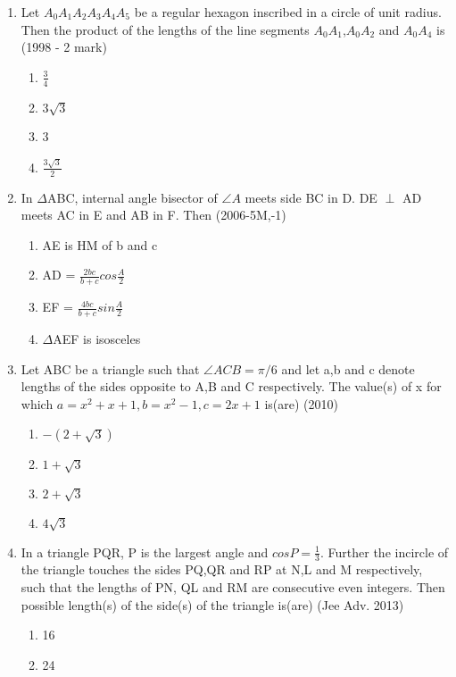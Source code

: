 \documentclass[journal,12pt,twocolumn]{IEEEtran}
\theoremstyle{remark}
\begin{document}
\begin{enumerate}[label=\arabic*.]
\begin{enumerate}[label=(\alph*)]
    \end{enumerate}
    \item Let $A_{0}A_{1}A_{2}A_{3}A_{4}A_{5}$ be a regular hexagon inscribed in a circle of unit radius. Then the product of the lengths of the line segments $A_{0}A_{1}$,$A_{0}A_{2}$ and $A_{0}A_{4}$ is 
    \hfill{(1998 - 2 mark)}
    \begin{enumerate}[label=(\alph*)]
    \item ${\frac{3}{4}}$
    \item $3\sqrt{3}$
    \item 3
    \item ${\frac{3\sqrt{3}}{2}}$
    \end{enumerate}
    \item In $\Delta$ABC, internal angle bisector of $\angle A$ meets side BC in D. DE $\perp$ AD meets AC in E and AB in F. Then
    \hfill{(2006-5M,-1)}
    \begin{enumerate}[label=(\alph*)]
    \item AE is HM of b and c
    \item AD = ${\frac{2bc}{b+c}}cos{\frac{A}{2}}$
    \item EF = ${\frac{4bc}{b+c}}sin{\frac{A}{2}}$
    \item $\Delta$AEF is isosceles
    \end{enumerate}
    \item Let ABC be a triangle such that $\angle ACB = \pi/6$ and let a,b and c denote lengths of the sides opposite to A,B and C respectively. The value(s) of x for which $a = x^{2}+x+1, b = x^{2}-1, c = 2x+1$ is(are)
    \hfill{(2010)}
    \begin{enumerate}[label=(\alph*)]
    \item $-(2+\sqrt{3})$
    \item $1+\sqrt{3}$
    \item $2+\sqrt{3}$
    \item $4\sqrt{3}$
    \end{enumerate}
    \item In a triangle PQR, P is the largest angle and $cosP = \frac{1}{3}$. Further the incircle of the triangle touches the sides PQ,QR and RP at N,L and M respectively, such that the lengths of PN, QL and RM are consecutive even integers. Then possible length(s) of the side(s) of the triangle is(are)
    \hfill{(Jee Adv. 2013)}
    \begin{enumerate}[label=(\alph*)]
    \item 16
    \item 24

\end{enumerate}
\end{enumerate}
\end{document}

